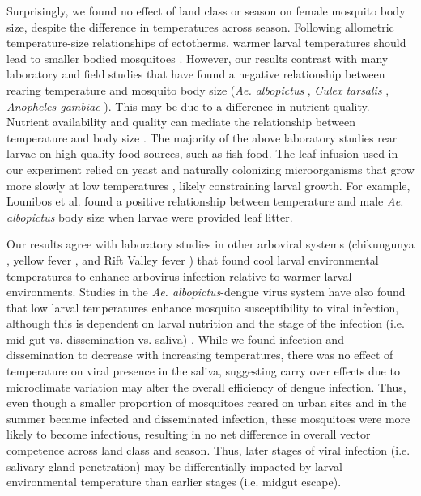 \documentclass[12pt]{article}
\begin{document}
Surprisingly, we found no effect of land class or season on female mosquito body size, despite the difference in temperatures across season. Following allometric temperature-size relationships of ectotherms, warmer larval temperatures should lead to smaller bodied mosquitoes \citep{angilleta2004}. However, our results contrast with many laboratory and field studies that have found a negative relationship between rearing temperature and mosquito body size (\textit{Ae. albopictus} \citep{reiskind2012a, murdock2017}, \textit{Culex tarsalis} \citep{dodson2012}, \textit{Anopheles gambiae} \citep{koella1996}). This may be due to a difference in nutrient quality. Nutrient availability and quality can mediate the relationship between temperature and body size \citep{farjana2011}. The majority of the above laboratory studies rear larvae on high quality food sources, such as fish food. The leaf infusion used in our experiment relied on yeast and naturally colonizing microorganisms that grow more slowly at low temperatures \citep{ratkowsky1982}, likely constraining larval growth. For example, Lounibos et al. \citep{lounibos2002} found a positive relationship between temperature and male \textit{Ae. albopictus} body size when larvae were provided leaf litter.

Our results agree with laboratory studies in other arboviral systems (chikungunya \citep{adelman2013}, yellow fever \citep{adelman2013}, and Rift Valley fever \citep{turell1993}) that found cool larval environmental temperatures to enhance arbovirus infection relative to warmer larval environments. Studies in the \textit{Ae. albopictus}-dengue virus system have also found that low larval temperatures enhance mosquito susceptibility to viral infection, although this is dependent on larval nutrition \citep{buckner2016} and the stage of the infection (i.e. mid-gut vs. dissemination vs. saliva) \citep{alto2013}. While we found infection and dissemination to decrease with increasing temperatures, there was no effect of temperature on viral presence in the saliva, suggesting carry over effects due to microclimate variation may alter the overall efficiency of dengue infection. Thus, even though a smaller proportion of mosquitoes reared on urban sites and in the summer became infected and disseminated infection, these mosquitoes were more likely to become infectious, resulting in no net difference in overall vector competence across land class and season. Thus, later stages of viral infection (i.e. salivary gland penetration) may be differentially impacted by larval environmental temperature than earlier stages (i.e. midgut escape).
\end{document}
